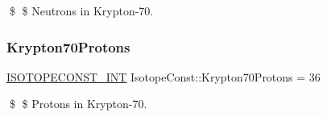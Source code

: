\$ \$ Neutrons in Krypton-\/70. \mbox{\label{group___isotope_const-_krypton-_kr70_gabeb7721514c255de2d9712986aa70db6}} 
\subsubsection{\texorpdfstring{Krypton70\+Protons}{Krypton70Protons}}
{\footnotesize\ttfamily \mbox{\hyperlink{group___isotope_const-_macros_ga5f18360b3e99483a35c32d789e62621c}{I\+S\+O\+T\+O\+P\+E\+C\+O\+N\+S\+T\+\_\+\+I\+NT}} Isotope\+Const\+::\+Krypton70\+Protons = 36}

\$ \$ Protons in Krypton-\/70. 